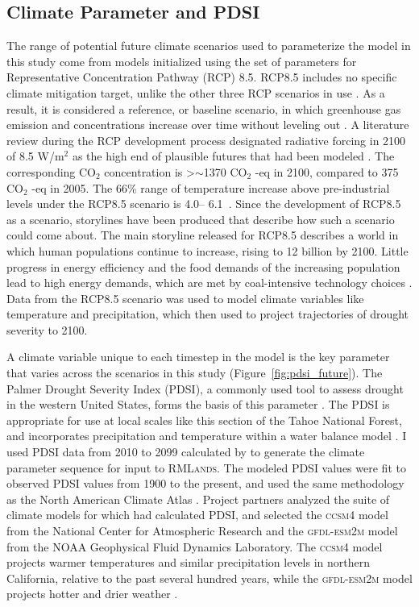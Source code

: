 \subsection*{Climate Parameter and PDSI}

The range of potential future climate scenarios used to parameterize the model in this study come from models initialized using the set of parameters for Representative Concentration Pathway (RCP) 8.5. RCP8.5 includes no specific climate mitigation target, unlike the other three RCP scenarios in use \citep{Riahi2011}. As a result, it is considered a reference, or baseline scenario, in which greenhouse gas emission and concentrations increase over time without leveling out \citep{Riahi2011}. A literature review during the RCP development process designated radiative forcing in 2100 of 8.5 W/m$^2$ as the high end of plausible futures that had been modeled \citep{VanVuuren2011}. The corresponding $\text{CO}_2$ concentration is \textgreater $\sim$1370 $\text{CO}_2$ -eq in 2100, compared to 375 $\text{CO}_2$ -eq in 2005. The 66\% range of temperature increase above pre-industrial levels under the RCP8.5 scenario is 4.0\textdegree -- 6.1\textdegree \ \citep{Rogelj2012}. Since the development of RCP8.5 as a scenario, storylines have been produced that describe how such a scenario could come about. The main storyline released for RCP8.5 describes a world in which human populations continue to increase, rising to 12 billion by 2100. Little progress in energy efficiency and the food demands of the increasing population lead to high energy demands, which are met by coal-intensive technology choices \citep{Riahi2011}. Data from the RCP8.5 scenario was used to model climate variables like temperature and precipitation, which \citet{Cook2014} then used to project trajectories of drought severity to 2100.

A climate variable unique to each timestep in the model is the key parameter that varies across the scenarios in this study (Figure~\ref{fig:pdsi_future}). The Palmer Drought Severity Index (PDSI), a commonly used tool to assess drought in the western United States, forms the basis of this parameter \citep{Cook2004,Cook2004}. The PDSI is appropriate for use at local scales like this section of the Tahoe National Forest, and incorporates precipitation and temperature within a water balance model \citep{HeimJr2002}. I used PDSI data from 2010 to 2099 calculated by \citet{Cook2014} to generate the climate parameter sequence for input to \textsc{RMLands}. The \citet{Cook2014} modeled PDSI values were fit to observed PDSI values from 1900 to the present, and used the same methodology as the North American Climate Atlas \citep{Cook2004}. Project partners analyzed the suite of climate models for which \citet{Cook2014} had calculated PDSI, and selected the \textsc{ccsm4} model from the National Center for Atmospheric Research and the \textsc{gfdl-esm2m} model from the NOAA Geophysical Fluid Dynamics Laboratory. The \textsc{ccsm4} model projects warmer temperatures and similar precipitation levels in northern California, relative to the past several hundred years, while the \textsc{gfdl-esm2m} model projects hotter and drier weather \citep{Weiss2013}.

